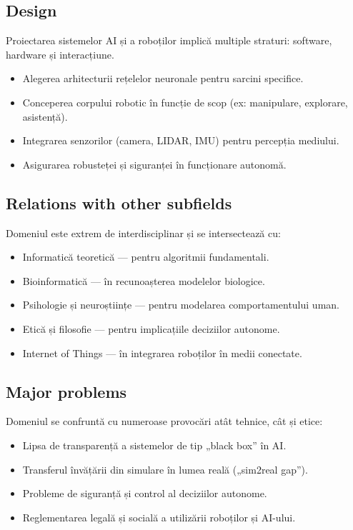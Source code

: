 \documentclass[12pt, letterpaper]{article}
\begin{document}
\subsection*{Design}
Proiectarea sistemelor AI și a roboților implică multiple straturi: software, hardware și interacțiune.
\begin{itemize}
    \item Alegerea arhitecturii rețelelor neuronale pentru sarcini specifice.
    \item Conceperea corpului robotic în funcție de scop (ex: manipulare, explorare, asistență).
    \item Integrarea senzorilor (camera, LIDAR, IMU) pentru percepția mediului.
    \item Asigurarea robusteței și siguranței în funcționare autonomă.
\end{itemize}

\subsection*{Relations with other subfields}
Domeniul este extrem de interdisciplinar și se intersectează cu:
\begin{itemize}
    \item Informatică teoretică — pentru algoritmii fundamentali.
    \item Bioinformatică — în recunoașterea modelelor biologice.
    \item Psihologie și neuroștiințe — pentru modelarea comportamentului uman.
    \item Etică și filosofie — pentru implicațiile deciziilor autonome.
    \item Internet of Things — în integrarea roboților în medii conectate.
\end{itemize}

\subsection*{Major problems}
Domeniul se confruntă cu numeroase provocări atât tehnice, cât și etice:
\begin{itemize}
    \item Lipsa de transparență a sistemelor de tip „black box” în AI.
    \item Transferul învățării din simulare în lumea reală („sim2real gap”).
    \item Probleme de siguranță și control al deciziilor autonome.
    \item Reglementarea legală și socială a utilizării roboților și AI-ului.
\end{itemize}
\end{document}
